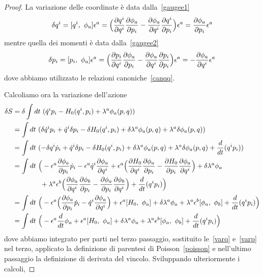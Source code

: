     \begin{proof}
    La variazione delle coordinate è data dalla~\eqref{gaugee1}
    \begin{equation} \label{varq}
        \delta q^i = [q^i, ~\phi_a] \epsilon^a = \Big(\frac{\partial q^i}{\partial q^i} \frac{\partial\phi_a}{\partial p_i} - \frac{\partial\phi_a}{\partial q^i} \frac{\partial q^i}{\partial p_i}\Big) \epsilon^a = \frac{\partial\phi_a}{\partial p_i} \epsilon^a 
    \end{equation}
    mentre quella dei momenti è data dalla~\eqref{gaugee2}
    \begin{equation} \label{varp}
        \delta p_i = [p_i, ~\phi_a] \epsilon^a = \Big(\frac{\partial p_i}{\partial q^i} \frac{\partial\phi_a}{\partial p_i} - \frac{\partial\phi_a}{\partial q^i} \frac{\partial p_i}{\partial p_i} \Big) \epsilon^a = - \frac{\partial\phi_a}{\partial q^i} \epsilon^a 
    \end{equation}
    dove abbiamo utilizzato le relazioni canoniche~\eqref{canqq}.

    Calcoliamo ora la variazione dell'azione
    \begin{equation*}
    \begin{aligned}
        \delta S & = \delta \int dt ~ (\dot q^i p_i - H_0(q^i, p_i) + \lambda^a \phi_a(p, q)) \\ & = \int dt ~ (\delta \dot q^i p_i + \dot q^i \delta p_i - \delta H_0(q^i, p_i) + \delta \lambda^a \phi_a(p, q) + \lambda^a \delta \phi_a(p, q)) \\ & = \int dt ~ (- \delta q^i \dot p_i + \dot q^i \delta p_i - \delta H_0(q^i, p_i) + \delta \lambda^a \phi_a(p, q) + \lambda^a \delta \phi_a(p, q) + \frac{d}{dt} (q^i p_i)) \\ & = \int dt ~ \Big (- \epsilon^a \frac{\partial\phi_a}{\partial p_i} \dot p_i - \epsilon^a \dot q^i \frac{\partial\phi_a}{\partial q^i} + \epsilon^a \Big (\frac{\partial H_0}{\partial q^i} \frac{\partial\phi_a}{\partial p_i} - \frac{\partial H_0}{\partial p_i} \frac{\partial\phi_a}{\partial q^i} \Big ) + \delta \lambda^a \phi_a \\ & \qquad \qquad + \lambda^a \epsilon^b \Big (\frac{\partial\phi_a}{\partial q^i} \frac{\partial\phi_b}{\partial p_i} - \frac{\partial\phi_a}{\partial p_i} \frac{\partial\phi_b}{\partial q^i} \Big) + \frac{d}{dt} (q^i p_i) \Big) \\ & = \int dt ~ \Big (- \epsilon^a \Big (\frac{\partial\phi_a}{\partial p_i} \dot p_i - \dot q^i \frac{\partial\phi_a}{\partial q^i} \Big ) + \epsilon^a [H_0, ~\phi_a] + \delta \lambda^a \phi_a + \lambda^a \epsilon^b [\phi_a, ~\phi_b] + \frac{d}{dt} (q^i p_i) \Big ) \\ & = \int dt ~ \Big (- \epsilon^a \frac{d}{dt} \phi_a + \epsilon^a [H_0, ~\phi_a] + \delta \lambda^a \phi_a + \lambda^a \epsilon^b [\phi_a, ~\phi_b] + \frac{d}{dt} (q^i p_i) \Big ) 
    \end{aligned}
    \end{equation*}
    dove abbiamo integrato per parti nel terzo passaggio, sostituito le~\eqref{varq} e~\eqref{varp} nel terzo, applicato la definizione di parentesi di Poisson~\eqref{poisson} e nell'ultimo passaggio la definizione di derivata del vincolo. Sviluppando ulteriormente i calcoli, 

\end{proof}
